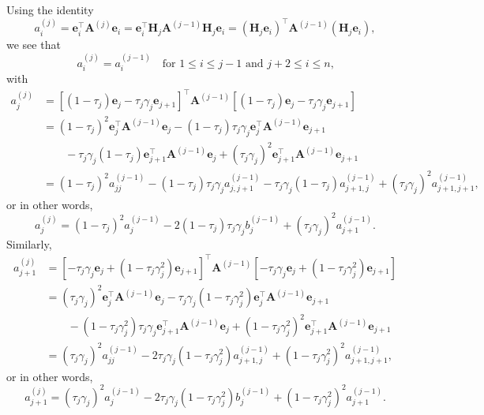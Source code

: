 \documentclass[12pt,a4paper]{article}
\newcommand{\bs}[1]{\boldsymbol{#1}}
\begin{document}
Using the identity
\[
a^{(j)}_i=\bs{e}_i^\top\bs{A}^{(j)}\bs{e}_i
	=\bs{e}_i^\top\bs{H}_j\bs{A}^{(j-1)}\bs{H}_j\bs{e}_i
	=(\bs{H}_j\bs{e}_i)^\top\bs{A}^{(j-1)}(\bs{H}_j\bs{e}_i),
\]
we see that
\[
a^{(j)}_i=a^{(j-1)}_i\quad\text{for $1\le i\le j-1$ and $j+2\le i\le n$,}
\]
with
\begin{align*}
a^{(j)}_j&=[(1-\tau_j)\bs{e}_j-\tau_j\gamma_j\bs{e}_{j+1}]^\top\bs{A}^{(j-1)}
	[(1-\tau_j)\bs{e}_j-\tau_j\gamma_j\bs{e}_{j+1}]\\
	&=(1-\tau_j)^2\bs{e}_j^\top\bs{A}^{(j-1)}\bs{e}_j
	-(1-\tau_j)\tau_j\gamma_j\bs{e}_j^\top\bs{A}^{(j-1)}\bs{e}_{j+1}\\
	&\qquad{}-\tau_j\gamma_j(1-\tau_j)\bs{e}_{j+1}^\top\bs{A}^{(j-1)}\bs{e}_j
	+(\tau_j\gamma_j)^2\bs{e}_{j+1}^\top\bs{A}^{(j-1)}\bs{e}_{j+1}\\
	&=(1-\tau_j)^2a^{(j-1)}_{jj}-(1-\tau_j)\tau_j\gamma_ja^{(j-1)}_{j,j+1}
	-\tau_j\gamma_j(1-\tau_j)a^{(j-1)}_{j+1,j}
	+(\tau_j\gamma_j)^2 a^{(j-1)}_{j+1,j+1},
\end{align*}
or in other words,
\[
a^{(j)}_j=(1-\tau_j)^2a^{(j-1)}_j-2(1-\tau_j)\tau_j\gamma_jb^{(j-1)}_j
	+(\tau_j\gamma_j)^2 a^{(j-1)}_{j+1}.
\]
Similarly,
\begin{align*}
a^{(j)}_{j+1}
&=[-\tau_j\gamma_j\bs{e}_j+(1-\tau_j\gamma_j^2)\bs{e}_{j+1}]^\top\bs{A}^{(j-1)}
    [-\tau_j\gamma_j\bs{e}_j+(1-\tau_j\gamma_j^2)\bs{e}_{j+1}]\\
	&=(\tau_j\gamma_j)^2\bs{e}_j^\top\bs{A}^{(j-1)}\bs{e}_j
	-\tau_j\gamma_j(1-\tau_j\gamma_j^2)\bs{e}_j^\top\bs{A}^{(j-1)}\bs{e}_{j+1}\\
	&\qquad-(1-\tau_j\gamma_j^2)\tau_j\gamma_j
		\bs{e}_{j+1}^\top\bs{A}^{(j-1)}\bs{e}_j
	+(1-\tau_j\gamma_j^2)^2\bs{e}_{j+1}^\top\bs{A}^{(j-1)}\bs{e}_{j+1}\\
	&=(\tau_j\gamma_j)^2a^{(j-1)}_{jj}
	-2\tau_j\gamma_j(1-\tau_j\gamma_j^2)a^{(j-1)}_{j+1,j}
	+(1-\tau_j\gamma_j^2)^2a^{(j-1)}_{j+1,j+1},
\end{align*}
or in other words,
\[
a^{(j)}_{j+1}=(\tau_j\gamma_j)^2a^{(j-1)}_j
	-2\tau_j\gamma_j(1-\tau_j\gamma_j^2)b^{(j-1)}_j
	+(1-\tau_j\gamma_j^2)^2a^{(j-1)}_{j+1}.
\]
\end{document}
